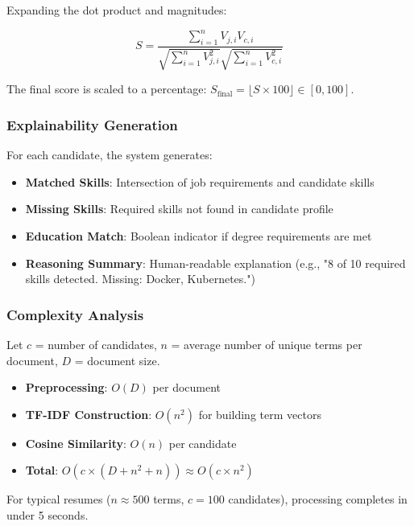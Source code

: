 \documentclass[conference]{IEEEtran}
\begin{document}
Expanding the dot product and magnitudes:

\begin{equation}
S = \frac{\sum_{i=1}^{n} V_{j,i} V_{c,i}}{\sqrt{\sum_{i=1}^{n} V_{j,i}^2} \sqrt{\sum_{i=1}^{n} V_{c,i}^2}}
\end{equation}

The final score is scaled to a percentage: $S_{\text{final}} = \lfloor S \times 100 \rfloor \in [0, 100]$.

\subsubsection{Explainability Generation}

For each candidate, the system generates:
\begin{itemize}
    \item \textbf{Matched Skills}: Intersection of job requirements and candidate skills
    \item \textbf{Missing Skills}: Required skills not found in candidate profile
    \item \textbf{Education Match}: Boolean indicator if degree requirements are met
    \item \textbf{Reasoning Summary}: Human-readable explanation (e.g., "8 of 10 required skills detected. Missing: Docker, Kubernetes.")
\end{itemize}

\subsubsection{Complexity Analysis}

Let $c$ = number of candidates, $n$ = average number of unique terms per document, $D$ = document size.

\begin{itemize}
    \item \textbf{Preprocessing}: $O(D)$ per document
    \item \textbf{TF-IDF Construction}: $O(n^2)$ for building term vectors
    \item \textbf{Cosine Similarity}: $O(n)$ per candidate
    \item \textbf{Total}: $O(c \times (D + n^2 + n)) \approx O(c \times n^2)$
\end{itemize}

For typical resumes ($n \approx 500$ terms, $c = 100$ candidates), processing completes in under 5 seconds.
\end{document}
